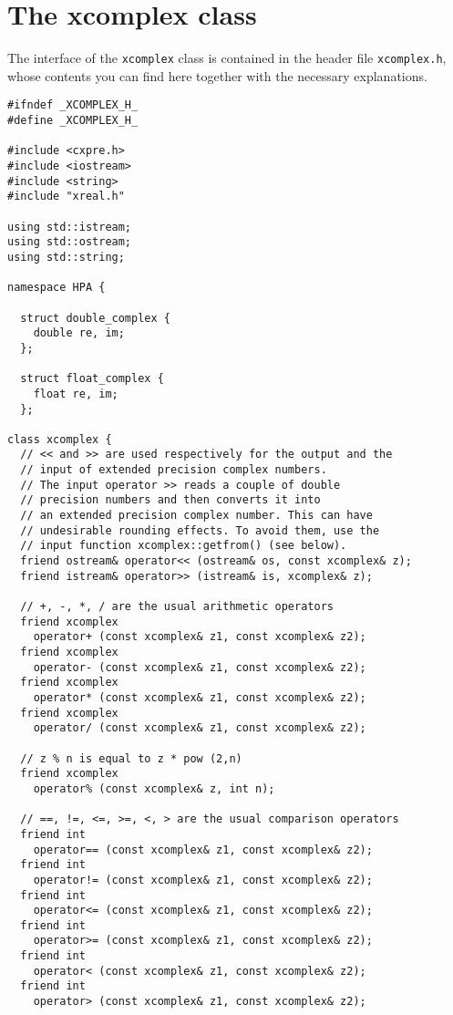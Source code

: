 \documentclass{article}
\begin{document}
\hypertarget{xcomplex_class}{}
\section{The xcomplex class}
The interface of the \texttt{xcomplex} class is
contained in the header file \texttt{xcomplex.h},
whose contents you can find here together
with the necessary explanations.

\begin{verbatim}
#ifndef _XCOMPLEX_H_
#define _XCOMPLEX_H_

#include <cxpre.h>
#include <iostream>
#include <string>
#include "xreal.h"

using std::istream;
using std::ostream;
using std::string;

namespace HPA {

  struct double_complex {
    double re, im;
  };

  struct float_complex {
    float re, im;
  };

class xcomplex {
  // << and >> are used respectively for the output and the
  // input of extended precision complex numbers.
  // The input operator >> reads a couple of double
  // precision numbers and then converts it into
  // an extended precision complex number. This can have 
  // undesirable rounding effects. To avoid them, use the
  // input function xcomplex::getfrom() (see below).
  friend ostream& operator<< (ostream& os, const xcomplex& z);
  friend istream& operator>> (istream& is, xcomplex& z);

  // +, -, *, / are the usual arithmetic operators
  friend xcomplex
    operator+ (const xcomplex& z1, const xcomplex& z2);
  friend xcomplex
    operator- (const xcomplex& z1, const xcomplex& z2);
  friend xcomplex 
    operator* (const xcomplex& z1, const xcomplex& z2);
  friend xcomplex
    operator/ (const xcomplex& z1, const xcomplex& z2);

  // z % n is equal to z * pow (2,n)
  friend xcomplex
    operator% (const xcomplex& z, int n);

  // ==, !=, <=, >=, <, > are the usual comparison operators
  friend int
    operator== (const xcomplex& z1, const xcomplex& z2);
  friend int
    operator!= (const xcomplex& z1, const xcomplex& z2);
  friend int
    operator<= (const xcomplex& z1, const xcomplex& z2);
  friend int
    operator>= (const xcomplex& z1, const xcomplex& z2);
  friend int
    operator< (const xcomplex& z1, const xcomplex& z2);
  friend int
    operator> (const xcomplex& z1, const xcomplex& z2);


\end{verbatim}
\end{document}
